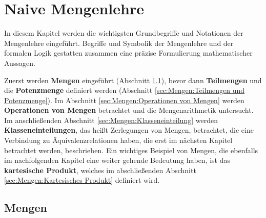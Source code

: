 
\chapter{Naive Mengenlehre}
\label{cha:Gdl-K04-Mengen}

In diesem Kapitel werden die wichtigsten Grundbegriffe und Notationen der 
Mengenlehre eingeführt. Begriffe und Symbolik der Mengenlehre und der formalen 
Logik gestatten zusammen eine präzise Formulierung mathematischer Aussagen.

Zuerst werden \textbf{Mengen} eingeführt (Abschnitt \ref{sec:Mengen:Mengen}), 
bevor dann \textbf{Teilmengen} und die \textbf{Potenzmenge} definiert werden
(Abschnitt \ref{sec:Mengen:Teilmengen und Potenzmenge}). Im Abschnitt 
\ref{sec:Mengen:Operationen von Mengen} werden \textbf{Operationen von Mengen} 
betrachtet und die Mengenarithmetik untersucht. Im anschließenden Abschnitt
\ref{sec:Mengen:Klasseneinteilung} werden \textbf{Klasseneinteilungen}, das 
heißt Zerlegungen von Mengen, betrachtet, die eine Verbindung zu
Äquivalenzrelationen haben, die erst im nächsten Kapitel betrachtet werden,
beschrieben. Ein wichtiges Beispiel von Mengen, die ebenfalls im nachfolgenden
Kapitel eine weiter gehende Bedeutung haben, ist das 
\textbf{kartesische Produkt}, welches im abschließenden Abschnitt
\ref{sec:Mengen:Kartesisches Produkt} definiert wird.

\section{Mengen}
\label{sec:Mengen:Mengen}


